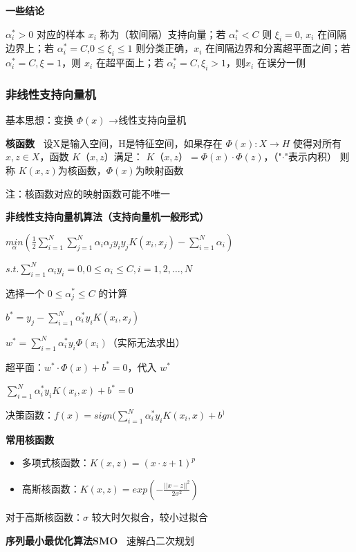 \documentclass[b4paper, 10pt]{ctexart}
\begin{document}
\begin{multicols}{3}
\textbf{一些结论\ }

$\alpha_i^*>0$ 对应的样本 $x_i$ 称为（软间隔）支持向量；若 $\alpha_i^* < C$ 则 $\xi_i = 0$, $x_i$ 在间隔边界上；若 $\alpha_i^*=C$,$0\le \xi_i \le 1$ 则分类正确，$x_i$ 在间隔边界和分离超平面之间；若 $\alpha_i^*=C,\xi=1$，则 $x_i$ 在超平面上；若 $\alpha_i^*=C,\xi_i>1$，则$x_i$ 在误分一侧

\subsubsection{非线性支持向量机}
基本思想：变换 $\Phi(x)$ →线性支持向量机

\textbf{核函数\ } 
设X是输入空间，H是特征空间，如果存在
$\Phi(x): X \to H$
使得对所有 $x,z\in X$，函数 $K（x,z）$满足：
$K（x,z）=\Phi(x)\cdot \Phi(z)$，（"$\cdot$"表示内积）
则称 $K(x,z)$为核函数，$\Phi(x)$为映射函数

注：核函数对应的映射函数可能不唯一

\textbf{非线性支持向量机算法（支持向量机一般形式）\ }

$
\underset{\alpha}{min} (\frac{1}{2}\sum_{i=1}^N \sum_{j=1}^N \alpha_i \alpha_j y_iy_j K(x_i, x_j) - \sum_{i=1}^N \alpha_i
)$

$
s.t. \sum_{i=1}^N \alpha_iy_i=0, 0\le \alpha_i\le C,i=1,2,\dots,N
$

选择一个 $0\le \alpha_j^* \le C$ 的计算 

$b^* = y_j - \sum_{i=1}^N \alpha_i^* y_i K(x_i,x_j)$

$w^* = \sum_{i=1}^N \alpha_i^* y_i \Phi (x_i)$（实际无法求出）

超平面：$w^*\cdot \Phi(x) + b^* = 0$，代入 $w^*$

$\sum_{i=1}^N \alpha_i^* y_i K(x_i,x) + b^*=0$

决策函数：$f(x)=sign(\sum_{i=1}^N \alpha_i^* y_i K(x_i,x) + b^)$

\textbf{常用核函数\ }
\begin{itemize}
    \item 多项式核函数：$K(x,z)=(x\cdot z+1)^p$
    \item 高斯核函数：$K(x,z)=exp(-\frac{||x-z||^2}{2\sigma^2})$
\end{itemize}

对于高斯核函数：$\sigma$ 较大时欠拟合，较小过拟合


\textbf{序列最小最优化算法SMO\ } 速解凸二次规划



\end{multicols}
\end{document}
